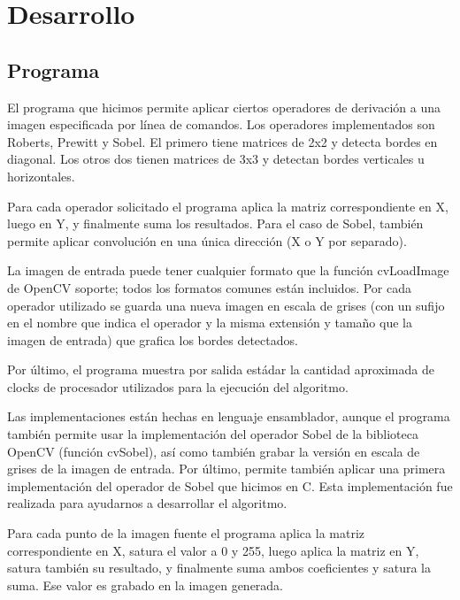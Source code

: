 \section{Desarrollo}

\subsection{Programa}

El programa que hicimos permite aplicar ciertos operadores de derivación a una imagen especificada por línea de comandos. Los operadores implementados son Roberts, Prewitt y Sobel. El primero tiene matrices de 2x2 y detecta bordes en diagonal. Los otros dos tienen matrices de 3x3 y detectan bordes verticales u horizontales.


%
%


Para cada operador solicitado el programa aplica la matriz correspondiente en X, luego en Y, y finalmente suma los resultados. Para el caso de Sobel, también permite aplicar convolución en una única dirección (X o Y por separado).

La imagen de entrada puede tener cualquier formato que la función cvLoadImage de OpenCV soporte; todos los formatos comunes están incluidos. Por cada operador utilizado se guarda una nueva imagen en escala de grises (con un sufijo en el nombre que indica el operador y la misma extensión y tamaño que la imagen de entrada) que grafica los bordes detectados.

Por último, el programa muestra por salida estádar la cantidad aproximada de clocks de procesador utilizados para la ejecución del algoritmo.

Las implementaciones están hechas en lenguaje ensamblador, aunque el programa también permite usar la implementación del operador Sobel de la biblioteca OpenCV (función cvSobel), así como también grabar la versión en escala de grises de la imagen de entrada. Por último, permite también aplicar una primera implementación del operador de Sobel que hicimos en C. Esta implementación fue realizada para ayudarnos a desarrollar el algoritmo.

Para cada punto de la imagen fuente el programa aplica la matriz correspondiente en X, satura el valor a 0 y 255, luego aplica la matriz en Y, satura también su resultado, y finalmente suma ambos coeficientes y satura la suma. Ese valor es grabado en la imagen generada.

